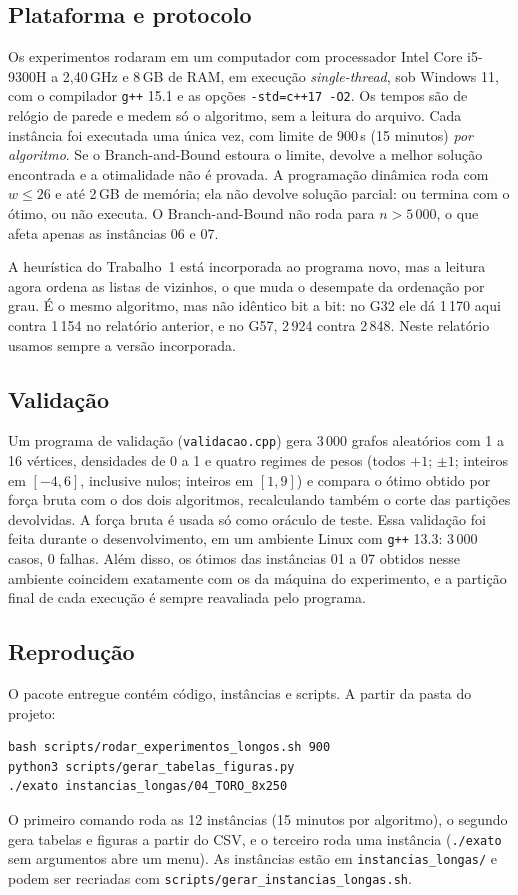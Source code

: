 \subsection{Plataforma e protocolo}

Os experimentos rodaram em um computador com processador Intel Core i5-9300H a 2,40\,GHz e 8\,GB de RAM, em execução \emph{single-thread}, sob Windows 11, com o compilador \texttt{g++} 15.1 e as opções \texttt{-std=c++17 -O2}. Os tempos são de relógio de parede e medem só o algoritmo, sem a leitura do arquivo. Cada instância foi executada uma única vez, com limite de 900\,s (15 minutos) \emph{por algoritmo}. Se o Branch-and-Bound estoura o limite, devolve a melhor solução encontrada e a otimalidade não é provada. A programação dinâmica roda com $w\le26$ e até 2\,GB de memória; ela não devolve solução parcial: ou termina com o ótimo, ou não executa. O Branch-and-Bound não roda para $n>5\,000$, o que afeta apenas as instâncias 06 e 07.

A heurística do Trabalho~1 está incorporada ao programa novo, mas a leitura agora ordena as listas de vizinhos, o que muda o desempate da ordenação por grau. É o mesmo algoritmo, mas não idêntico bit a bit: no G32 ele dá 1\,170 aqui contra 1\,154 no relatório anterior, e no G57, 2\,924 contra 2\,848. Neste relatório usamos sempre a versão incorporada.

\subsection{Validação}

Um programa de validação (\texttt{validacao.cpp}) gera 3\,000 grafos aleatórios com 1 a 16 vértices, densidades de 0 a 1 e quatro regimes de pesos (todos $+1$; $\pm1$; inteiros em $[-4,6]$, inclusive nulos; inteiros em $[1,9]$) e compara o ótimo obtido por força bruta com o dos dois algoritmos, recalculando também o corte das partições devolvidas. A força bruta é usada só como oráculo de teste. Essa validação foi feita durante o desenvolvimento, em um ambiente Linux com \texttt{g++} 13.3: 3\,000 casos, 0 falhas. Além disso, os ótimos das instâncias 01 a 07 obtidos nesse ambiente coincidem exatamente com os da máquina do experimento, e a partição final de cada execução é sempre reavaliada pelo programa.

\subsection{Reprodução}

O pacote entregue contém código, instâncias e scripts. A partir da pasta do projeto:
\begin{verbatim}
bash scripts/rodar_experimentos_longos.sh 900
python3 scripts/gerar_tabelas_figuras.py
./exato instancias_longas/04_TORO_8x250
\end{verbatim}
O primeiro comando roda as 12 instâncias (15 minutos por algoritmo), o segundo gera tabelas e figuras a partir do CSV, e o terceiro roda uma instância (\texttt{./exato} sem argumentos abre um menu). As instâncias estão em \texttt{instancias\_longas/} e podem ser recriadas com \texttt{scripts/gerar\_instancias\_longas.sh}.
